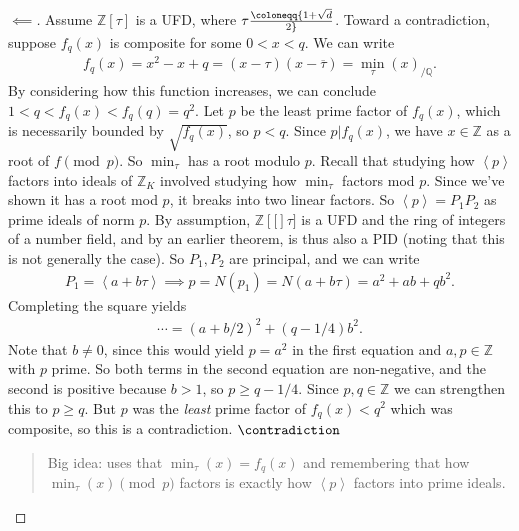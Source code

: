 \begin{proof}[$\impliedby$]

Assume \(\mathbb{Z}\left[ { \tau } \right]\) is a UFD, where
\(\tau\coloneqq{1 + \sqrt{d} \over 2 }\). Toward a contradiction,
suppose \(f_q(x)\) is composite for some \(0<x<q\). We can write
\begin{align*}
f_q(x) = x^2 - x + q = (x - \tau)( x - {\overline{{ \tau}}} ) = \min_{ \tau}(x)_{/{\mathbb{Q}}}
.\end{align*}
By considering how this function increases, we can conclude
\(1<q<f_q(x) < f_q(q) = q^2\). Let \(p\) be the least prime factor of
\(f_q(x)\), which is necessarily bounded by \(\sqrt{ f_q(x) }\), so
\(p<q\). Since \(p\mathrel{\Big|}f_q(x)\), we have \(x\in {\mathbb{Z}}\)
as a root of \(f\pmod p\). So \(\min_\tau\) has a root modulo \(p\).
Recall that studying how \(\left\langle{ p }\right\rangle\) factors into
ideals of \({\mathbb{Z}}_K\) involved studying how \(\min_\tau\) factors
mod \(p\). Since we've shown it has a root mod \(p\), it breaks into two
linear factors. So \(\left\langle{ p }\right\rangle = P_1 P_2\) as prime
ideals of norm \(p\). By assumption,
\(\mathbb{Z}\left[ {[} \right]\tau]\) is a UFD and the ring of integers
of a number field, and by an earlier theorem, is thus also a PID (noting
that this is not generally the case). So \(P_1, P_2\) are principal, and
we can write
\begin{align*}
P_1 = \left\langle{ a + b \tau }\right\rangle\implies p = N(p_1) = N( a + b \tau) = a^2 + ab + qb^2
.\end{align*}
Completing the square yields
\begin{align*}
\cdots = (a + b/2)^2 + (q-1/4)b^2
.\end{align*}
Note that \(b\neq 0\), since this would yield \(p = a^2\) in the first
equation and \(a, p \in {\mathbb{Z}}\) with \(p\) prime. So both terms
in the second equation are non-negative, and the second is positive
because \(b>1\), so \(p \geq q- 1/4\). Since \(p, q\in {\mathbb{Z}}\) we
can strengthen this to \(p \geq q\). But \(p\) was the \emph{least}
prime factor of \(f_q(x) < q^2\) which was composite, so this is a
contradiction. \(\contradiction\)

\begin{quote}
Big idea: uses that \(\min_\tau(x) = f_q(x)\) and remembering that how
\(\min_\tau(x) \pmod p\) factors is exactly how
\(\left\langle{ p }\right\rangle\) factors into prime ideals.
\end{quote}

\end{proof}

